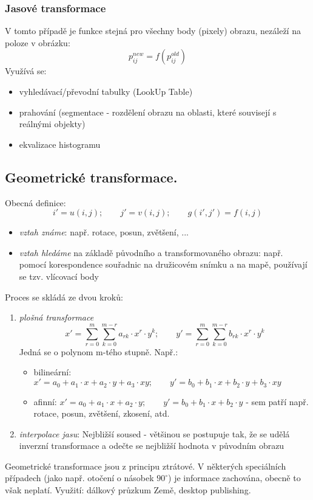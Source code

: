 \subsubsection*{Jasové transformace}
V tomto případě je funkce stejná pro všechny body (pixely) obrazu, nezáleží na poloze v obrázku:
\begin{equation}
p^{new}_{ij} = f(p^{old}_{ij})
\end{equation}
Využívá se:
\begin{itemize}
\item vyhledávací/převodní tabulky (LookUp Table)
\vspace{2.5cm}
\item prahování (segmentace - rozdělení obrazu na oblasti, které souvisejí s reálnými objekty)
\vspace{2.5cm}
\item ekvalizace histogramu
\end{itemize}

\subsection{Geometrické transformace.}
Obecná definice:
\begin{equation}
i' = u(i,j); \qquad j' = v(i,j); \qquad g(i',j') = f(i,j)
\end{equation}
\begin{itemize}
\item \textit{vztah známe}: např. rotace, posun, zvětšení, ...
\item \textit{vztah hledáme} na základě původního a transformovaného obrazu: např. pomocí korespondence souřadnic na družicovém snímku a na mapě, používají se tzv. vlícovací body
\end{itemize}
Proces se skládá ze dvou kroků:
\begin{enumerate}
\item \textit{plošná transformace}
\begin{equation}
x' = \displaystyle{\sum_{r=0}^m \sum_{k=0}^{m-r}} a_{rk} \cdot x^r \cdot y^k; \qquad y' = \displaystyle{\sum_{r=0}^m \sum_{k=0}^{m-r}} b_{rk} \cdot x^r \cdot y^k
\end{equation}
Jedná se o polynom m-tého stupně. Např.:
\begin{itemize}
\item bilineární: $ x' = a_0 + a_1 \cdot x + a_2 \cdot y + a_3 \cdot xy; \qquad y' = b_0 + b_1 \cdot x + b_2 \cdot y + b_3 \cdot xy $
\item afinní: $ x' = a_0 + a_1 \cdot x + a_2 \cdot y; \qquad y' = b_0 + b_1 \cdot x + b_2 \cdot y $ - sem patří např. rotace, posun, zvětšení, zkosení, atd.
\end{itemize}
\item \textit{interpolace jasu}: Nejbližší soused - většinou se postupuje tak, že se udělá inverzní transformace a odečte se nejbližší hodnota v původním obrazu
\end{enumerate}
\vspace{2cm}
Geometrické transformace jsou z principu ztrátové. V některých speciálních případech (jako např. otočení o násobek $ 90^\circ $) je informace zachována, obecně to však neplatí. Využití: dálkový průzkum Země, desktop publishing.

